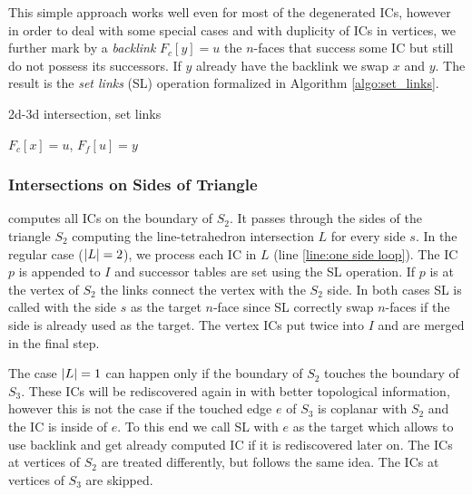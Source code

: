 This simple approach works well even for most of the degenerated ICs, however in order to deal with some special cases and 
with duplicity of ICs in vertices, we further mark by a \emph{backlink} $F_c[y]=u$ the $n$-faces that success some IC but still do not possess its successors.
If $y$ already have the backlink we swap $x$ and $y$. The result is the \emph{set links} (SL) operation formalized in Algorithm \ref{algo:set_links}.
\begin{algorithm}
  \caption{2d-3d intersection, set links}
  \label{algo:set_links}
  \DontPrintSemicolon  
  $F_c[x]=u$, $F_f[u]=y$\;
\end{algorithm}





\subsubsection{Intersections on Sides of Triangle}
\label{sec:sides}
 computes all ICs on the boundary of $S_2$.  It passes through the sides of the triangle $S_2$ 
computing  the line-tetrahedron intersection $L$ for every side $s$. 
In the regular case ($\left|L\right|=2$), we process each IC in $L$ (line \ref{line:one side loop}).
The IC $p$ is appended to $I$ and successor tables are set using the SL operation. If $p$ is at the vertex of
$S_2$ the links connect the vertex with the $S_2$ side. In both cases SL  is called with the side $s$ as the target $n$-face
since SL correctly swap $n$-faces if the side is already used as the target. The vertex ICs put twice into $I$ and are merged
in the final step.

The case $\left|L\right|=1$ can happen only if the boundary of $S_2$ touches the boundary of $S_3$. These ICs will be 
rediscovered again in  with better topological information, however this is not the 
case if the touched edge $e$ of $S_3$ is coplanar with $S_2$ and the IC is inside of $e$.
To this end we call SL with $e$ as the target which allows to use backlink and get already computed IC if it is rediscovered later on.
The ICs at vertices of $S_2$ are treated differently, but follows the same idea. The ICs at vertices of $S_3$ are skipped.

